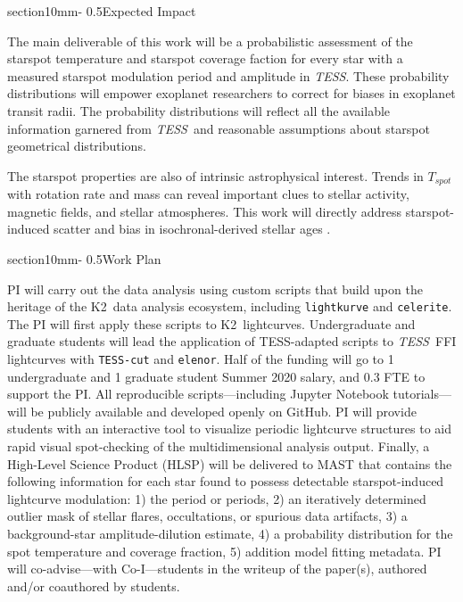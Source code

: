 \documentclass[letterpaper,12pt]{article}
\makeatletter
\renewcommand{\section}{\@startsection%
{section}{1}{0mm}{-\baselineskip}%
{0.5\baselineskip}{\normalfont\Large\bfseries}}%
\newcommand{\tess}{{\it TESS}}
\newcommand{\ktwo}{{K2}}
\makeatother
\begin{document}
\section{Expected Impact}

The main deliverable of this work will be a probabilistic assessment of the starspot temperature and starspot coverage faction for every star with a measured starspot modulation period and amplitude in \tess.  These probability distributions will empower exoplanet researchers to correct for biases in exoplanet transit radii.  The probability distributions will reflect all the available information garnered from \tess\ and reasonable assumptions about starspot geometrical distributions.

The starspot properties are also of intrinsic astrophysical interest.  Trends in $T_{spot}$ with rotation rate and mass can reveal important clues to stellar activity, magnetic fields, and stellar atmospheres.  This work will directly address starspot-induced scatter and bias in isochronal-derived stellar ages \cite{2015ApJ...807..174S, 2017ApJ...836..200G}.

\section{Work Plan}

PI will carry out the data analysis using custom scripts that build upon the heritage of the \ktwo\ data analysis ecosystem, including \texttt{lightkurve} and \texttt{celerite}.  The PI will first apply these scripts to \ktwo\ lightcurves.  Undergraduate and graduate students will lead the application of TESS-adapted scripts to \tess\ FFI lightcurves with \texttt{TESS-cut} and \texttt{elenor}.  Half of the funding will go to 1 undergraduate and 1 graduate student Summer 2020 salary, and 0.3 FTE to support the PI.  All reproducible scripts---including Jupyter Notebook tutorials---will be publicly available and developed openly on GitHub.  PI will provide students with an interactive tool to visualize periodic lightcurve structures to aid rapid visual spot-checking of the multidimensional analysis output.  Finally, a High-Level Science Product (HLSP) will be delivered to MAST that contains the following information for each star found to possess detectable starspot-induced lightcurve modulation: 1) the period or periods, 2) an iteratively determined outlier mask of stellar flares, occultations, or spurious data artifacts, 3) a background-star amplitude-dilution estimate, 4) a probability distribution for the spot temperature and coverage fraction, 5) addition model fitting metadata.  PI will co-advise---with Co-I---students in the writeup of the paper(s), authored and/or coauthored by students.


\newpage


\end{document}
